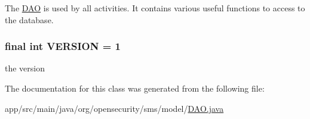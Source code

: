 The \hyperlink{a00009}{D\+A\+O} is used by all activities. It contains various useful functions to access to the database. \hypertarget{a00009_a6cad282e2a906561926b9e4c5c46e92a}{
\subsubsection[{V\+E\+R\+S\+I\+O\+N}]{\setlength{\rightskip}{0pt plus 5cm}final int V\+E\+R\+S\+I\+O\+N = 1\hspace{0.3cm}{\ttfamily [static]}}}\label{a00009_a6cad282e2a906561926b9e4c5c46e92a}
the version 

The documentation for this class was generated from the following file\+:\begin{DoxyCompactItemize}
\item 
app/src/main/java/org/opensecurity/sms/model/\hyperlink{a00018}{D\+A\+O.\+java}\end{DoxyCompactItemize}
